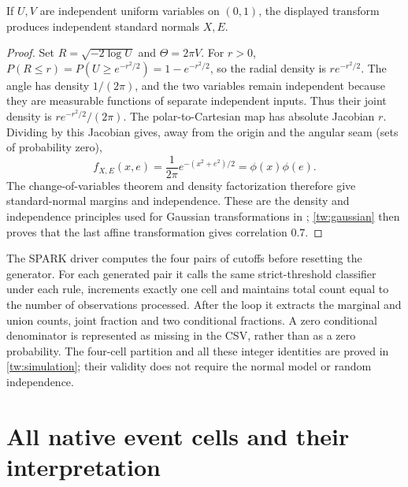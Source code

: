 \begin{proposition}\label{tw:box-muller}
If \(U,V\) are independent uniform variables on \((0,1)\), the displayed
transform produces independent standard normals \(X,E\).
\end{proposition}
\begin{proof}
Set \(R=\sqrt{-2\log U}\) and \(\Theta=2\pi V\).
For \(r>0\),
\(P(R\leq r)=P(U\geq e^{-r^2/2})=1-e^{-r^2/2}\), so the radial
density is \(re^{-r^2/2}\). The angle has density \(1/(2\pi)\), and
the two variables remain independent because they are measurable functions
of separate independent inputs. Thus their joint density is
\(re^{-r^2/2}/(2\pi)\). The polar-to-Cartesian map has absolute Jacobian
\(r\). Dividing by this Jacobian gives, away from the origin and the
angular seam (sets of probability zero),
\[
 f_{X,E}(x,e)=\frac{1}{2\pi}e^{-(x^2+e^2)/2}
             =\phi(x)\phi(e).
\]
The change-of-variables theorem and density factorization therefore give
standard-normal margins and independence. These are the density and
independence principles used for Gaussian transformations in
\citet[Chapter 3]{gallager2013}; \cref{tw:gaussian} then proves that the
last affine transformation gives correlation \(0.7\).
\end{proof}

The SPARK driver computes the four pairs of cutoffs before resetting the
generator. For each generated pair it calls the same strict-threshold
classifier under each rule, increments exactly one cell and maintains total
count equal to the number of observations processed. After the loop it
extracts the marginal and union counts, joint fraction and two conditional
fractions. A zero conditional denominator is represented as missing in the
CSV, rather than as a zero probability. The four-cell partition and all these
integer identities are proved in \cref{tw:simulation}; their validity does
not require the normal model or random independence.

\section{All native event cells and their interpretation}

